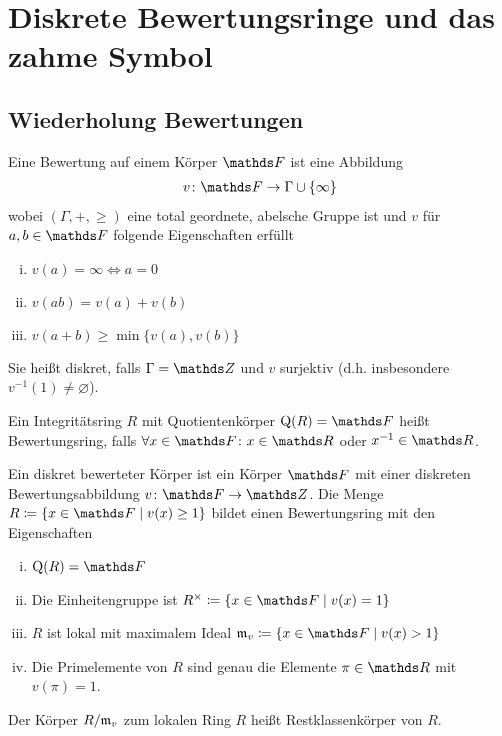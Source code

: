 \documentclass[ngerman,fontsize=11pt, paper=a4, parskip=half, titlepage=true, toc=bib]{scrartcl}
\begin{document}
\section{Diskrete Bewertungsringe und das zahme Symbol}
\cite[][Lemma 2.1]{milnor}

\subsection{Wiederholung Bewertungen}
\begin{Def}[Bewertungsabbildung]
Eine Bewertung auf einem Körper $\F$ ist eine Abbildung
\begin{gather*}
  v\colon\F\to \Gamma\cup \{\infty\}
\end{gather*}
wobei $(\Gamma, +,\geq)$ eine total geordnete, abelsche Gruppe ist
und $v$ für $a,b\in\F$ folgende Eigenschaften erfüllt
\begin{enumerate}[i)]
\item $v(a)=\infty \Longleftrightarrow a=0$
\item $v(ab)=v(a)+v(b)$
\item $v(a+b)\geq \min\{v(a),v(b)\}$
\end{enumerate}
Sie heißt diskret, falls $\Gamma=\Z$ und $v$ surjektiv
(d.h. insbesondere $v^{-1}(1)\neq \varnothing$).
\end{Def}

\begin{Wdh}[Bewertungsring]
  Ein Integritätsring $R$ mit Quotientenkörper $\Quot(R)=\F$ heißt
  Bewertungsring, falls $\forall x\in\F\colon x\in\R$ oder $x^{-1}\in\R$.
\end{Wdh}


\begin{Wdh}
  Ein diskret bewerteter Körper ist ein Körper $\F$ mit einer diskreten
  Bewertungsabbildung $ v\colon \F\to \Z$.
  Die Menge $R\coloneqq\left\{x\in \F\mid  v(x)\geq 1\right\}$ bildet
  einen Bewertungsring mit den Eigenschaften
  \begin{enumerate}[i)]
  \item $\Quot(R)=\F$
  \item Die Einheitengruppe ist $R^\times\coloneqq\left\{x\in\F\mid v(x)=1\right\}$
  \item $R$ ist lokal mit maximalem Ideal
    $\frakm_v\coloneqq\left\{x\in\F\mid v(x)>1\right\}$
  \item Die Primelemente von $R$ sind genau die Elemente $\pi\in\R$ mit $v(\pi)=1$.
  \end{enumerate}
  Der Körper $R/\mathfrak{m}_v$ zum lokalen Ring $R$ heißt Restklassenkörper
  von $R$.
\end{Wdh}
\end{document}

